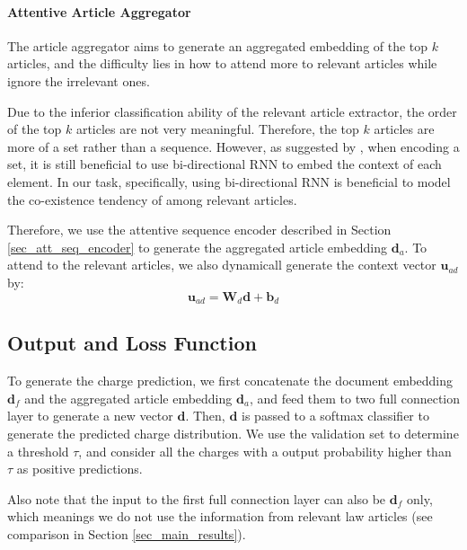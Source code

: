 \paragraph{Attentive Article Aggregator}
The article aggregator aims to generate an aggregated embedding of the top $k$ articles, and the difficulty lies in how to attend more to relevant articles while ignore the irrelevant ones. 

Due to the inferior classification ability of the relevant article extractor, the order of the top $k$ articles are not very meaningful. Therefore, the top $k$ articles are more of a set rather than a sequence. However, as suggested by \cite{vinyals2016matching}, when encoding a set, it is still beneficial to use bi-directional RNN to embed the context of each element.
In our task, specifically, using bi-directional RNN is beneficial to model the co-existence tendency of among relevant articles.

Therefore, we use the attentive sequence encoder described in Section \ref{sec_att_seq_encoder} to generate the aggregated article embedding $\mathbf{d}_a$. To attend to the relevant articles, we also dynamicall generate the context vector $\mathbf{u}_{ad}$ by:
\begin{equation}
\mathbf{u}_{ad} = \mathbf{W}_d \mathbf{d} + \mathbf{b}_d
\end{equation}


\subsection{Output and Loss Function}
To generate the charge prediction, we first concatenate the document embedding $\mathbf{d}_f$ and the aggregated article embedding $\mathbf{d}_a$, and feed them to two full connection layer to generate a new vector $\mathbf{d}$. Then, $\mathbf{d}$ is passed to a softmax classifier to generate the predicted charge distribution. We use the validation set to determine a threshold $\tau$, and consider all the charges with a output probability higher than $\tau$ as positive predictions.

Also note that the input to the first full connection layer can also be $\mathbf{d}_f$ only, which meanings we do not use the information from relevant law articles (see comparison in Section \ref{sec_main_results}). 

